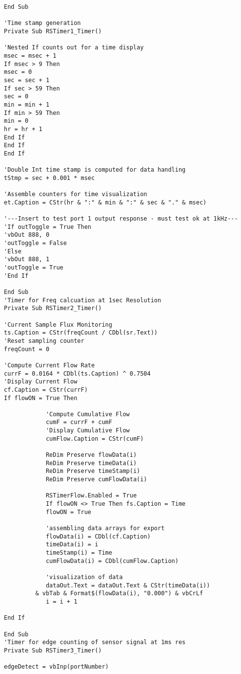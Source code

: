 \begin{singlespace}
\begin{small}
\begin{verbatim}
End Sub

'Time stamp generation
Private Sub RSTimer1_Timer()

'Nested If counts out for a time display
msec = msec + 1
If msec > 9 Then
msec = 0
sec = sec + 1
If sec > 59 Then
sec = 0
min = min + 1
If min > 59 Then
min = 0
hr = hr + 1
End If
End If
End If

'Double Int time stamp is computed for data handling
tStmp = sec + 0.001 * msec

'Assemble counters for time visualization
et.Caption = CStr(hr & ":" & min & ":" & sec & "." & msec)

'---Insert to test port 1 output response - must test ok at 1kHz---
'If outToggle = True Then
'vbOut 888, 0
'outToggle = False
'Else
'vbOut 888, 1
'outToggle = True
'End If

End Sub
'Timer for Freq calcuation at 1sec Resolution
Private Sub RSTimer2_Timer()

'Current Sample Flux Monitoring
ts.Caption = CStr(freqCount / CDbl(sr.Text))
'Reset sampling counter
freqCount = 0

'Compute Current Flow Rate
currF = 0.0164 * CDbl(ts.Caption) ^ 0.7504
'Display Current Flow
cf.Caption = CStr(currF)
If flowON = True Then

            'Compute Cumulative Flow
            cumF = currF + cumF
            'Display Cumulative Flow
            cumFlow.Caption = CStr(cumF)

            ReDim Preserve flowData(i)
            ReDim Preserve timeData(i)
            ReDim Preserve timeStamp(i)
            ReDim Preserve cumFlowData(i)
            
            RSTimerFlow.Enabled = True
            If flowON <> True Then fs.Caption = Time
            flowON = True
            
            'assembling data arrays for export
            flowData(i) = CDbl(cf.Caption)
            timeData(i) = i
            timeStamp(i) = Time
            cumFlowData(i) = CDbl(cumFlow.Caption)
            
            'visualization of data
            dataOut.Text = dataOut.Text & CStr(timeData(i))
		 & vbTab & Format$(flowData(i), "0.000") & vbCrLf
            i = i + 1

End If

End Sub
'Timer for edge counting of sensor signal at 1ms res
Private Sub RSTimer3_Timer()

edgeDetect = vbInp(portNumber)


\end{verbatim}
\end{small}
\end{singlespace}
